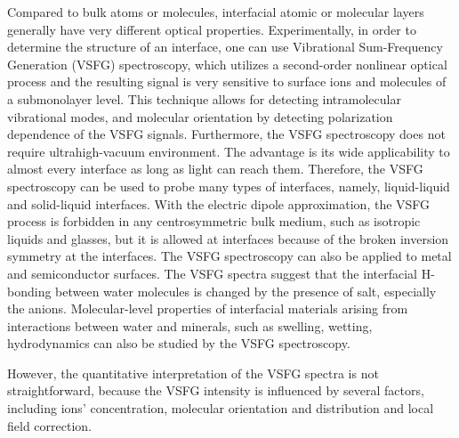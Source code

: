 Compared to bulk atoms or molecules,
interfacial atomic or molecular layers generally have very different optical properties. 
Experimentally, in order to determine the structure of an interface, one can use Vibrational Sum-Frequency Generation (VSFG) spectroscopy,
which utilizes a second-order nonlinear optical process and the resulting signal is very sensitive to surface ions and 
molecules of a submonolayer level. \cite{Morita2008,WangHongFei2015,WenYuChieh2016,Ishiyama2017,Penalber-Johnstone2018} 
This technique allows for detecting intramolecular vibrational modes, and molecular orientation by detecting polarization dependence of the VSFG signals. \cite{Vidal05}  
Furthermore, the VSFG spectroscopy does not require ultrahigh-vacuum environment. \cite{WeiX02}
The advantage is its wide applicability to almost every interface as long as light can reach them. 
Therefore, the VSFG spectroscopy can be used to probe many types of interfaces, namely, liquid-liquid and 
solid-liquid interfaces. \cite{Guyot-Sionnest1987,RS91,Du93,QD94,Richmond02,Gopalakrishnan2006,ShenYR2006,Morita2008}
With the electric dipole approximation, the VSFG process is forbidden in any centrosymmetric bulk medium, \cite{Che2012}
such as isotropic liquids and glasses,  but it is allowed at interfaces because of the broken inversion symmetry at the interfaces. \cite{PF00}
The VSFG spectroscopy can also be applied to metal and semiconductor surfaces. \cite{Harris87,Superfine88}
The VSFG spectra suggest that the interfacial H-bonding between water molecules is changed by the presence of salt, 
especially the anions. \cite{EAR04}
Molecular-level properties of interfacial materials arising from interactions between water and minerals, 
such as swelling, wetting, hydrodynamics can also be studied by the VSFG spectroscopy. \cite{Rotenberg14}

However, the quantitative interpretation of the VSFG spectra is not straightforward,
because the VSFG intensity is influenced by several factors, including ions' concentration, 
molecular orientation and distribution and local field correction. \cite{Morita2008}

